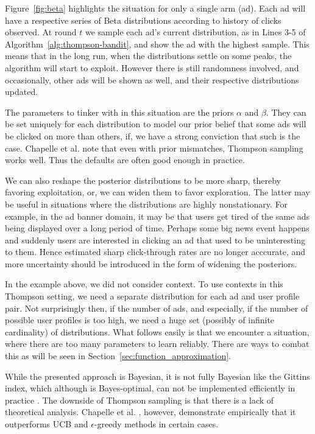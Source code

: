 \documentclass{article} %
\begin{document}
Figure~\ref{fig:beta} highlights the situation for only a single arm (ad).
Each ad will have a respective series of Beta distributions according to
history of clicks observed. At round $t$ we sample each ad's current
distribution, as in Lines 3-5 of Algorithm~\ref{alg:thompson-bandit}, and show
the ad with the highest sample. This means that in the long run, when the
distributions settle on some peaks, the algorithm will start to exploit.
However there is still randomness involved, and occasionally, other ads will be
shown as well, and their respective distributions updated.

The parameters to tinker with in this situation are the priors $\alpha$ and
$\beta$. They can be set uniquely for each distribution to model our prior
belief that some ads will be clicked on more than others, if, we have a strong
conviction that such is the case. Chapelle et al. \cite{chapelle2011empirical}
note that even with prior mismatches, Thompson sampling works well. Thus the
defaults are often good enough in practice.

We can also reshape the posterior distributions to be more sharp, thereby
favoring exploitation, or, we can widen them to favor exploration. The latter
may be useful in situations where the distributions are highly nonstationary.
For example, in the ad banner domain, it may be that users get tired of the
same ads being displayed over a long period of time. Perhaps some big news
event happens and suddenly users are interested in clicking an ad that used to
be uninteresting to them. Hence estimated sharp click-through rates are no
longer acccurate, and more uncertainty should be introduced in the form of
widening the posteriors.

In the example above, we did not consider context.  To use contexts in this
Thompson setting, we need a separate distribution for each ad and user profile
pair. Not surprisingly then, if the number of ads, and especially, if the
number of possible user profiles is too high, we need a huge set (possibly of
infinite cardinality) of distributions. What follows easily is that we
encounter a situation, where there are too many parameters to learn reliably.
There are ways to combat this as will be seen in
Section~\ref{sec:function_approximation}.

While the presented approach is Bayesian, it is not fully Bayesian like the
Gittins index, which although is Bayes-optimal, can not be implemented
efficiently in practice \cite{chapelle2011empirical}. The downside of Thompson
sampling is that there is a lack of theoretical analysis. Chapelle et al.
\cite{chapelle2011empirical}, however, demonstrate empirically that it
outperforms UCB \cite{auer2002finite} and $\epsilon$-greedy methods in certain
cases.
\end{document}
